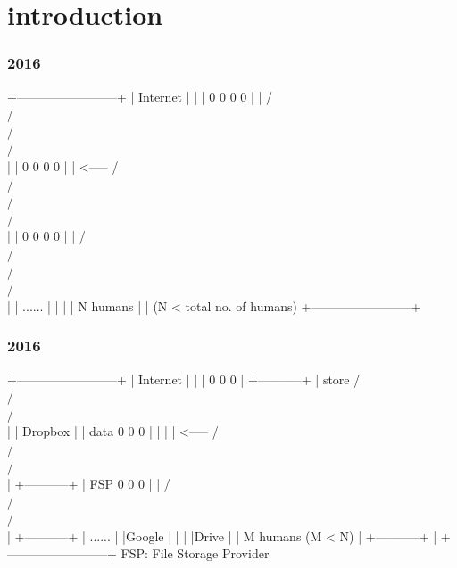 
\section{introduction}

\begin{frame}[fragile]
  \frametitle{2016}
  {\scriptsize
  \begin{semiverbatim}
   +------------------------+
   | Internet               |
   |                        |          0   0   0   0
   |                        |         / \\ / \\ / \\ / \\
   |                        |          0   0   0   0
   |                        | <-----  / \\ / \\ / \\ / \\
   |                        |          0   0   0   0
   |                        |         / \\ / \\ / \\ / \\
   |                        |              ......
   |                        |
   |                        |             N humans
   |                        |       (N < total no. of humans)
   +------------------------+
  \end{semiverbatim}
  }
\end{frame}


\begin{frame}[fragile]
  \frametitle{2016}
  {\scriptsize
  \begin{semiverbatim}
   +------------------------+
   | Internet               |
   |                        |          0   0   0
   |  +-----------+         | store   / \\ / \\ / \\
   |  | Dropbox   |         |  data    0   0   0
   |  |           |         | <-----  / \\ / \\ / \\
   |  +-----------+         |   FSP    0   0   0
   |                        |         / \\ / \\ / \\
   |          +-----------+ |           ......
   |          |Google     | |
   |          |Drive      | |             M humans (M < N)
   |          +-----------+ |
   +------------------------+      FSP: File Storage Provider
  \end{semiverbatim}
  }
\end{frame}

